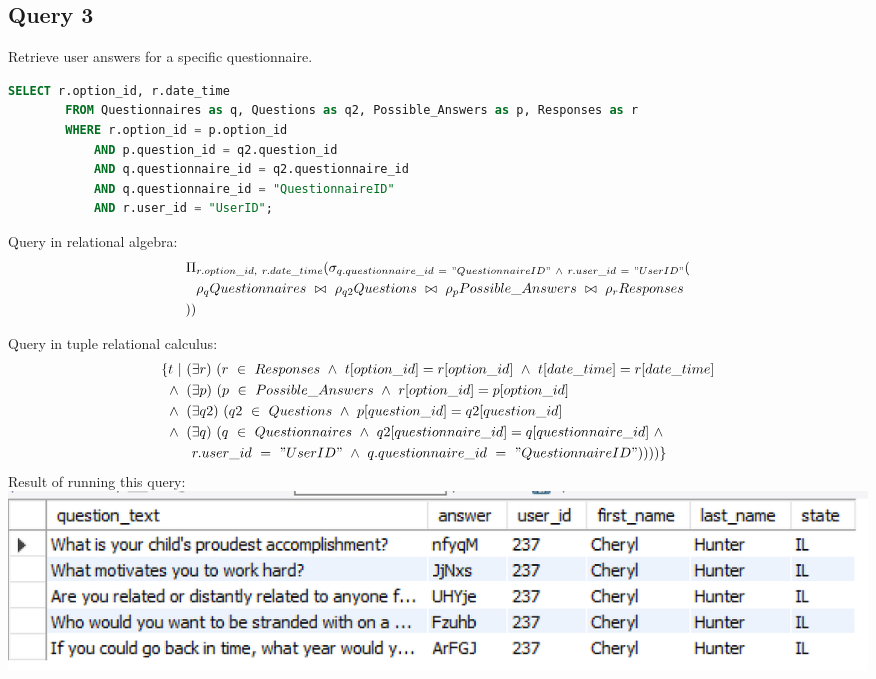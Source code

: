 \documentclass[12pt, oneside, a4paper]{article}
\begin{document}
    \subsection*{Query 3}
    \noindent Retrieve user answers for a specific questionnaire.
    \begin{lstlisting}[language=SQL, columns=flexible, breaklines]
        SELECT r.option_id, r.date_time
        FROM Questionnaires as q, Questions as q2, Possible_Answers as p, Responses as r
        WHERE r.option_id = p.option_id 
            AND p.question_id = q2.question_id 
            AND q.questionnaire_id = q2.questionnaire_id
            AND q.questionnaire_id = "QuestionnaireID"
            AND r.user_id = "UserID";
    \end{lstlisting}
    \noindent Query in relational algebra: 
    \begin{align*}
        \Pi&_{r.option\_id,\ r.date\_time}(\sigma_{q.questionnaire\_id\ =\ "QuestionnaireID"\ \wedge\ r.user\_id\ =\ "UserID"}
        (\\
        &\rho_{q}Questionnaires\ \bowtie\ \rho_{q2}Questions\ \bowtie\ \rho_{p}Possible\_Answers\ \bowtie\ \rho_{r}Responses\\
        ))&
    \end{align*}
    
    \bigskip
    \noindent \noindent \noindent Query in tuple relational calculus: 
    \begin{align*}
        \{t\ |\ (&\exists r)\ (r\ \in\ Responses\ \wedge\ t[option\_id] = r[option\_id]\ \wedge\ t[date\_time] = r[date\_time]\\
        \newline\wedge\ (&\exists p)\ (p\ \in\ Possible\_Answers\ \wedge\ r[option\_id]=p[option\_id]\\
        \newline\wedge\ (&\exists q2)\ (q2\ \in\ Questions\ \wedge\ p[question\_id] = q2[question\_id]\\
        \newline\wedge\ (&\exists q)\ (q\ \in\ Questionnaires\ \wedge\ q2[questionnaire\_id] = q[questionnaire\_id]\ \wedge\ \\
        &r.user\_id\ =\ "UserID"\ \wedge\ q.questionnaire\_id\ =\ "QuestionnaireID"))))\}
    \end{align*}
    \noindent Result of running this query:\\
    \includegraphics{questionstatequeryresult.PNG}
\end{document}
